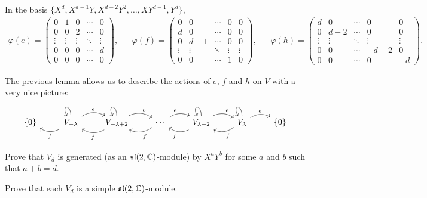 In the basis $\{X^d,X^{d-1}Y,X^{d-2}Y^2,\dots,XY^{d-1},Y^d\}$, 
\begin{align*}
\varphi(e)=\left(\begin{smallmatrix}
0 & 1 & 0 & \cdots & 0\\
0 & 0 & 2 & \cdots & 0\\
\vdots & \vdots & \vdots & \ddots & \vdots\\
0 & 0 & 0 & \cdots & d\\
0 & 0 & 0 & \cdots & 0
\end{smallmatrix}\right),
&& 
\varphi(f)=\left(\begin{smallmatrix}
0 & 0 & \cdots & 0 & 0\\
d & 0 & \cdots & 0 & 0\\
0 & d-1 & \cdots & 0 & 0\\
\vdots & \vdots & \ddots & \vdots & \vdots\\
0 & 0 & \cdots & 1 & 0
\end{smallmatrix}\right),
&&
\varphi(h)=\left(\begin{smallmatrix}
d & 0 & \cdots & 0 & 0\\
0 & d-2 & \cdots & 0 & 0\\
\vdots & \vdots & \ddots & \vdots & \vdots\\
0 & 0 & \cdots & -d+2 & 0\\
0 & 0 & \cdots & 0 & -d
\end{smallmatrix}\right).
\end{align*}

The previous lemma allows us to describe the actions of 
$e$, $f$ and $h$ on $V$ with a very nice picture:
\[
\begin{tikzcd}
\{0\} 
& V_{-\lambda} \arrow[out=90,in=120,loop]\arrow[l,bend left,"f"]\arrow[r,bend left,"e"]
& V_{-\lambda+2} \arrow[out=90,in=120,loop]\arrow[l,bend left,"f"]\arrow[r,bend left,"e"]
& \cdots\arrow[l,bend left,"f"]\arrow[r,bend left,"e"]
& V_{\lambda-2} \arrow[out=90,in=120,loop]\arrow[l,bend left,"f"]\arrow[r,bend left,"e"]
& V_{\lambda} \arrow[out=90,in=120,loop]\arrow[r,bend left,"e"]\arrow[l,bend left,"f"]
& \{0\}
\end{tikzcd}
\]

\begin{exercise}
    Prove that $V_d$ is generated (as an $\mathfrak{sl}(2,\mathbb{C})$-module) by
    $X^aY^b$ for some $a$ and $b$ such that $a+b=d$. 
\end{exercise}

\begin{exercise}
    Prove that each $V_d$ is a simple $\mathfrak{sl}(2,\mathbb{C})$-module.
\end{exercise}

